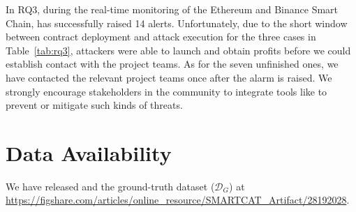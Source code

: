 In RQ3, during the real-time monitoring of the Ethereum and Binance Smart Chain, {\tool} has successfully raised 14 alerts. Unfortunately, due to the short window between contract deployment and attack execution for the three cases in Table~\ref{tab:rq3}, attackers were able to launch and obtain profits before we could establish contact with the project teams.
As for the seven unfinished ones, we have contacted the relevant project teams once after the alarm is raised.
We strongly encourage stakeholders in the community to integrate tools like {\tool} to prevent or mitigate such kinds of threats. 

\section*{Data Availability}

We have released {\tool} and the ground-truth dataset ($\mathcal{D}_G$) at \url{https://figshare.com/articles/online_resource/SMARTCAT_Artifact/28192028}.



